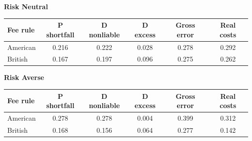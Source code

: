 \documentclass[10pt,border=5pt,varwidth=17cm]{standalone}
\begin{document}
\begingroup
\small
\setlength{\tabcolsep}{5pt}
\renewcommand{\arraystretch}{1.20}
\noindent\textbf{Risk Neutral}\par\smallskip
\noindent\begin{tabularx}{\linewidth}{@{}>{\raggedright\arraybackslash}Xccccc@{}}
\toprule
\textbf{Fee rule} & \textbf{P shortfall} & \textbf{D nonliable} & \textbf{D excess} & \textbf{Gross error} & \textbf{Real costs} \\
\midrule
American & 0.216 & 0.222 & 0.028 & 0.278 & 0.292 \\
British & 0.167 & 0.197 & 0.096 & 0.275 & 0.262 \\
\bottomrule\end{tabularx}\par\medskip
\noindent\textbf{Risk Averse}\par\smallskip
\noindent\begin{tabularx}{\linewidth}{@{}>{\raggedright\arraybackslash}Xccccc@{}}
\toprule
\textbf{Fee rule} & \textbf{P shortfall} & \textbf{D nonliable} & \textbf{D excess} & \textbf{Gross error} & \textbf{Real costs} \\
\midrule
American & 0.278 & 0.278 & 0.004 & 0.399 & 0.312 \\
British & 0.168 & 0.156 & 0.064 & 0.277 & 0.142 \\
\bottomrule\end{tabularx}\par\medskip
\endgroup
\end{document}
